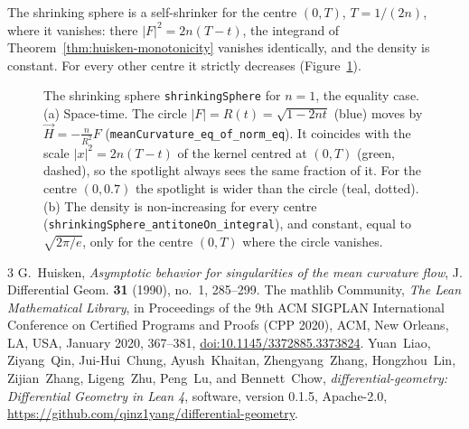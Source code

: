 The shrinking sphere is a self-shrinker for the centre $(0, T)$, $T = 1/(2n)$, where it
vanishes: there $|F|^2 = 2n(T - t)$, the integrand of Theorem~\ref{thm:huisken-monotonicity}
vanishes identically, and the density is constant. For every other centre it strictly
decreases (Figure~\ref{fig:sphere}).

\begin{figure}[htbp]
\centering
{}
\caption{The shrinking sphere \texttt{shrinkingSphere} for $n = 1$, the equality case.
(a) Space-time. The circle $|F| = R(t) = \sqrt{1 - 2nt}$ (blue) moves by
$\vec H = -\frac{n}{R^2}F$ (\texttt{meanCurvature\_eq\_of\_norm\_eq}). It coincides with the
scale $|x|^2 = 2n(T - t)$ of the kernel centred at $(0, T)$ (green, dashed), so the
spotlight always sees the same fraction of it. For the centre $(0, 0.7)$ the spotlight is
wider than the circle (teal, dotted). (b) The density is non-increasing for every centre
(\texttt{shrinkingSphere\_antitoneOn\_integral}), and constant, equal to $\sqrt{2\pi/e}$, only
for the centre $(0, T)$ where the circle vanishes.}
\label{fig:sphere}
\end{figure}

\begin{thebibliography}{3}
 G.~Huisken, \emph{Asymptotic behavior for singularities of the mean
  curvature flow}, J. Differential Geom. \textbf{31} (1990), no.~1, 285--299.
 The mathlib Community, \emph{The Lean Mathematical Library}, in
  Proceedings of the 9th ACM SIGPLAN International Conference on Certified Programs and
  Proofs (CPP 2020), ACM, New Orleans, LA, USA, January 2020, 367--381,
  \href{https://doi.org/10.1145/3372885.3373824}{doi:10.1145/3372885.3373824}.
 Yuan~Liao, Ziyang~Qin, Jui-Hui~Chung, Ayush~Khaitan, Zhengyang~Zhang, Hongzhou~Lin, Zijian~Zhang, Ligeng~Zhu, Peng~Lu, and Bennett~Chow,
  \emph{differential-geometry: Differential Geometry in
  Lean 4}, software, version 0.1.5, Apache-2.0,
  \url{https://github.com/qinz1yang/differential-geometry}.
\end{thebibliography}
